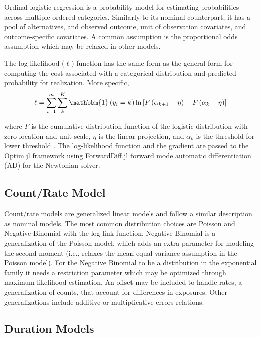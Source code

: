 \documentclass{juliacon}
\begin{document}
Ordinal logistic regression is a probability model for estimating probabilities across multiple ordered categories. Similarly to its nominal counterpart, it has a pool of alternatives, and observed outcome, unit of observation covariates, and outcome-specific covariates. A common assumption is the proportional odds assumption which may be relaxed in other models.

The log-likelihood ($\ell$) function has the same form as the general form for computing the cost associated with a categorical distribution and predicted probability for realization. More specific,
\begin{equation}
	\ell = \sum_{i = 1}^{m} \sum_{k}^{K} \mathbbm{1}\left(y_{i} = k\right) \ln\left[F\left(\alpha_{k + 1} - \eta\right) - F\left(\alpha_{k} - \eta\right)\right]
\end{equation}

where $F$ is the cumulative distribution function of the logistic distribution with zero location and unit scale, $\eta$ is the linear projection, and $\alpha_{k}$ is the threshold for lower threshold \cite{ologit}. The log-likelihood function and the gradient are passed to the Optim.jl framework \cite{Optim} using ForwardDiff.jl \cite{ForwardDiff} forward mode automatic differentiation (AD) for the Newtonian solver.

\subsection{Count/Rate Model}

Count/rate models are generalized linear models and follow a similar description as nominal models. The most common distribution choices are Poisson and Negative Binomial with the log link function. Negative Binomial is a generalization of the Poisson model, which adds an extra parameter for modeling the second moment (i.e., relaxes the mean equal variance assumption in the Poisson model). For the Negative Binomial to be a distribution in the exponential family it needs a restriction parameter which may be optimized through maximum likelihood estimation. An offset may be included to handle rates, a generalization of counts, that account for differences in exposures. Other generalizations include additive or multiplicative errors relations.

\subsection{Duration Models}
\end{document}
